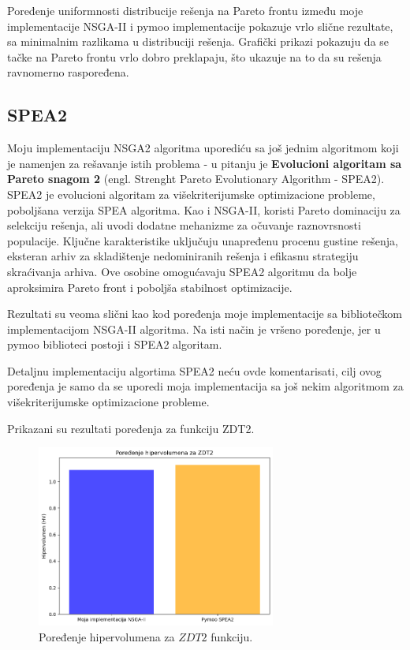 \documentclass[12pt]{article}
\begin{document}
Poređenje uniformnosti distribucije rešenja na Pareto frontu između moje implementacije NSGA-II i pymoo implementacije pokazuje vrlo slične rezultate, sa minimalnim razlikama u distribuciji rešenja. Grafički prikazi pokazuju da se tačke na Pareto frontu vrlo dobro preklapaju, što ukazuje na to da su rešenja ravnomerno raspoređena.

\subsection{SPEA2}
Moju implementaciju NSGA2 algoritma uporediću sa još jednim algoritmom koji je namenjen za rešavanje istih problema - u pitanju je \textbf{Evolucioni algoritam sa Pareto snagom 2} (engl. Strenght Pareto Evolutionary Algorithm - SPEA2). 
SPEA2 je evolucioni algoritam za višekriterijumske optimizacione probleme, poboljšana verzija SPEA algoritma. Kao i NSGA-II, koristi Pareto dominaciju za selekciju rešenja, ali uvodi dodatne mehanizme za očuvanje raznovrsnosti populacije. Ključne karakteristike uključuju unapređenu procenu gustine rešenja, eksteran arhiv za skladištenje nedominiranih rešenja i efikasnu strategiju skraćivanja arhiva. Ove osobine omogućavaju SPEA2 algoritmu da bolje aproksimira Pareto front i poboljša stabilnost optimizacije.

Rezultati su veoma slični kao kod poređenja moje implementacije sa bibliotečkom implementacijom NSGA-II algoritma. Na isti način je vršeno poređenje, jer u pymoo biblioteci postoji i SPEA2 algoritam.

Detaljnu implementaciju algortima SPEA2 neću ovde komentarisati, cilj ovog poređenja je samo da se uporedi moja implementacija sa još nekim algoritmom za višekriterijumske optimizacione probleme.

Prikazani su rezultati poređenja za funkciju ZDT2.
\begin{figure}[H]
    \centering
    \includegraphics[width=0.7\textwidth]{images/hv_spea2.png}
    \caption{Poređenje hipervolumena za \( ZDT2 \) funkciju.}
    \label{fig:hv_spea2}
\end{figure}
\end{document}
